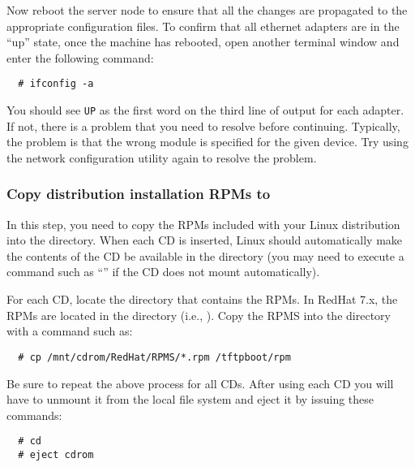 \endchange

Now reboot the server node to ensure that all the changes are
propagated to the appropriate configuration files. To confirm that all
ethernet adapters are in the ``up'' state, once the machine has
rebooted, open another terminal window and enter the following
command:

\begin{verbatim}
  # ifconfig -a
\end{verbatim}
  
You should see {\tt UP} as the first word on the third line of output
for each adapter. If not, there is a problem that you need to resolve
before continuing. Typically, the problem is that the wrong module is
specified for the given device. Try using the network configuration
utility again to resolve the problem.
  

\subsubsection{Copy distribution installation RPMs to }
\label{det:rpmcopy}

In this step, you need to copy the RPMs included with your Linux
distribution into the  directory.  When each CD is
inserted, Linux should automatically make the contents of the CD be
available in the  directory (you may need to execute
a command such as ``'' if the CD does not mount
automatically).  

For each CD, locate the directory that contains the RPMs.  In RedHat
7.x, the RPMs are located in the  directory (i.e.,
).  Copy the RPMS into the
 directory with a command such as:

\begin{verbatim}
  # cp /mnt/cdrom/RedHat/RPMS/*.rpm /tftpboot/rpm
\end{verbatim}
  
Be sure to repeat the above process for all CDs.  After using each CD
you will have to unmount it from the local file system and eject it by
issuing these commands:

\begin{verbatim}
  # cd
  # eject cdrom
\end{verbatim}


